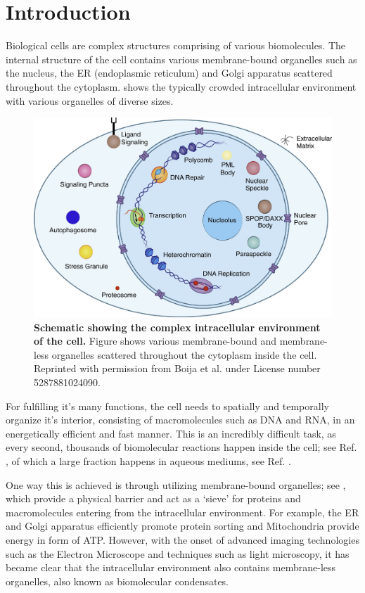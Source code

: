 \onehalfspacing

\chapter{Introduction}
\label{chap:Introduction}

Biological cells are complex structures comprising of various biomolecules.
The internal structure of the cell contains various membrane-bound organelles such as the nucleus, the ER (endoplasmic reticulum) and Golgi apparatus scattered throughout the cytoplasm.
 shows the typically crowded intracellular environment with various organelles of diverse sizes.
\begin{figure}[tb]
\centering
\includegraphics[scale=0.4]{MainContent/BioFigures/basic_image.pdf}
\caption{\textbf{Schematic showing the complex intracellular environment of the cell.}
Figure shows various membrane-bound and membrane-less organelles scattered throughout the cytoplasm inside the cell.
Reprinted with permission from Boija et al. \cite{Boija2021} under License number 5287881024090.
}
\label{fig:basic_image}
\end{figure}
For fulfilling it's many functions, the cell needs to spatially and temporally organize it's interior, consisting of macromolecules such as DNA and RNA, in an energetically efficient and fast manner.
This is an incredibly difficult task, as every second, thousands of biomolecular reactions happen inside the cell; see Ref. \cite{Flamholz2014}, of which a large fraction happens in aqueous mediums, see Ref. \cite{Mitrea2016}.

One way this is achieved is through utilizing membrane-bound organelles; see , which provide a physical barrier and act as a `sieve' for proteins and macromolecules entering from the intracellular environment.
For example, the ER and Golgi apparatus efficiently promote protein sorting and Mitochondria provide energy in form of ATP.
However, with the onset of advanced imaging technologies such as the Electron Microscope and techniques such as light microscopy, it has became clear that the intracellular environment also contains membrane-less organelles, also known as biomolecular condensates. 

